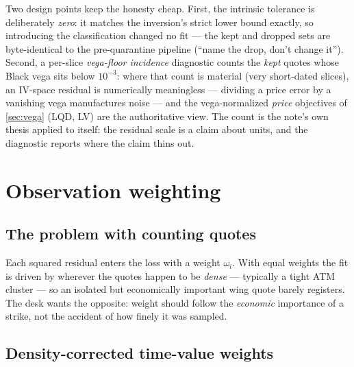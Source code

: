 \documentclass[11pt]{article}
\begin{document}
Two design points keep the honesty cheap. First, the intrinsic tolerance is
deliberately \emph{zero}: it matches the inversion's strict lower bound
exactly, so introducing the classification changed no fit --- the kept and
dropped sets are byte-identical to the pre-quarantine pipeline
(``name the drop, don't change it''). Second, a per-slice \emph{vega-floor
incidence} diagnostic counts the \emph{kept} quotes whose Black vega sits
below $10^{-3}$: where that count is material (very short-dated slices), an
IV-space residual is numerically meaningless --- dividing a price error by a
vanishing vega manufactures noise --- and the vega-normalized \emph{price}
objectives of \cref{sec:vega} (LQD, LV) are the authoritative view. The
count is the note's own thesis applied to itself: the residual scale is a
claim about units, and the diagnostic reports where the claim thins out.

\section{Observation weighting}
\label{sec:weights}

\subsection{The problem with counting quotes}

Each squared residual enters the loss with a weight $\omega_i$. With equal weights
the fit is driven by wherever the quotes happen to be \emph{dense} --- typically a
tight ATM cluster --- so an isolated but economically important wing quote barely
registers. The desk wants the opposite: weight should follow the \emph{economic}
importance of a strike, not the accident of how finely it was sampled.

\subsection{Density-corrected time-value weights}
\end{document}
